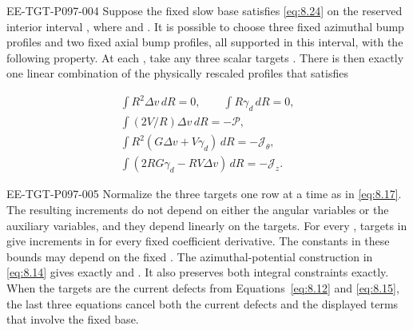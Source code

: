 \begin{lemma}\label{lem:8.7}
\begin{EESegment}{EE-TGT-P097-004}
Suppose the fixed slow base satisfies \eqref{eq:8.24} on the reserved interior interval
, where  and
. It is possible to choose three fixed azimuthal bump
profiles and two fixed axial bump profiles, all supported in this interval, with the following
property. At each , take any three scalar targets
. There is then exactly one
linear combination  of the physically rescaled profiles
that satisfies
\end{EESegment}
\begin{equation}
\begin{gathered}
\int R^2\Delta v\,dR=0,\qquad \int R\gamma_d\,dR=0,\\
\int (2V/R)\Delta v\,dR=-\mathcal P,\\
\int R^2(G\Delta v+V\gamma_d)\,dR=-\mathcal J_\theta,\\
\int (2RG\gamma_d-RV\Delta v)\,dR=-\mathcal J_z.
\end{gathered}
\tag{8.25}\label{eq:8.25}
\end{equation}
\begin{EESegment}{EE-TGT-P097-005}
Normalize the three targets one row at a time as in \eqref{eq:8.17}. The resulting increments do
not depend on either the angular variables or the auxiliary variables, and they depend linearly on
the targets. For every , targets in
 give increments in
 for every fixed coefficient derivative. The constants in
these bounds may depend on the fixed . The azimuthal-potential
construction in \eqref{eq:8.14} gives  exactly and
. It also preserves both integral
constraints exactly. When the targets are the current defects from Equations~\eqref{eq:8.12} and
\eqref{eq:8.15}, the last three equations cancel both the current defects and the displayed terms
that involve the fixed base.
\end{EESegment}
\end{lemma}

